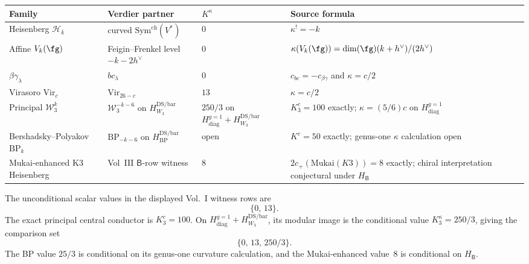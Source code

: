 \begin{center}
\renewcommand{\arraystretch}{1.35}
\begin{tabular}{|p{3.6cm}|p{3.2cm}|p{3.2cm}|p{3.0cm}|}
\hline
\textbf{Family} & \textbf{Verdier partner} &
\textbf{$K^\kappa$} & \textbf{Source formula} \\
\hline\hline
Heisenberg $\mathcal H_k$ &
curved $\mathrm{Sym}^{\mathrm{ch}}(V^*)$ &
$0$ & $\kappa^!=-k$ \\
\hline
Affine $V_k(\fg)$ &
Feigin--Frenkel level $-k-2h^\vee$ &
$0$ &
$\kappa(V_k(\fg))=\dim(\fg)(k+h^\vee)/(2h^\vee)$ \\
\hline
$\beta\gamma_\lambda$ &
$bc_\lambda$ &
$0$ &
$c_{bc}=-c_{\beta\gamma}$ and $\kappa=c/2$ \\
\hline
Virasoro $\mathrm{Vir}_c$ &
$\mathrm{Vir}_{26-c}$ &
$13$ &
$\kappa=c/2$ \\
\hline
Principal $\mathcal W_3^k$ &
$\mathcal W_3^{-k-6}$ on $H_{W_3}^{\mathrm{DS/bar}}$ &
$250/3$ on
$H_{\mathrm{diag}}^{g=1}+H_{W_3}^{\mathrm{DS/bar}}$ &
$K_3^c=100$ exactly;
$\kappa=(5/6)c$ on $H_{\mathrm{diag}}^{g=1}$ \\
\hline
Bershadsky--Polyakov $\mathrm{BP}_k$ &
$\mathrm{BP}_{-k-6}$ on $H_{\mathrm{BP}}^{\mathrm{DS/bar}}$ &
open &
$K^c=50$ exactly; genus-one $\kappa$ calculation open \\
\hline
Mukai-enhanced K3 Heisenberg &
Vol~III $\mathsf B$-row witness &
$8$ &
$2c_+(\mathrm{Mukai}(K3))=8$ exactly;
chiral interpretation conjectural under $H_{\mathsf B}$ \\
\hline
\end{tabular}
\end{center}
The unconditional scalar values in the displayed Vol.~I witness rows
are
\[
\{0,\,13\}.
\]
The exact principal central conductor is $K_3^c=100$.  On
$H_{\mathrm{diag}}^{g=1}+H_{W_3}^{\mathrm{DS/bar}}$, its modular
image is the conditional value $K_3^\kappa=250/3$, giving the
comparison set
\[
\{0,\,13,\,250/3\}.
\]
The BP value $25/3$ is conditional on its genus-one curvature
calculation, and the Mukai-enhanced value~$8$ is conditional on
$H_{\mathsf B}$.

